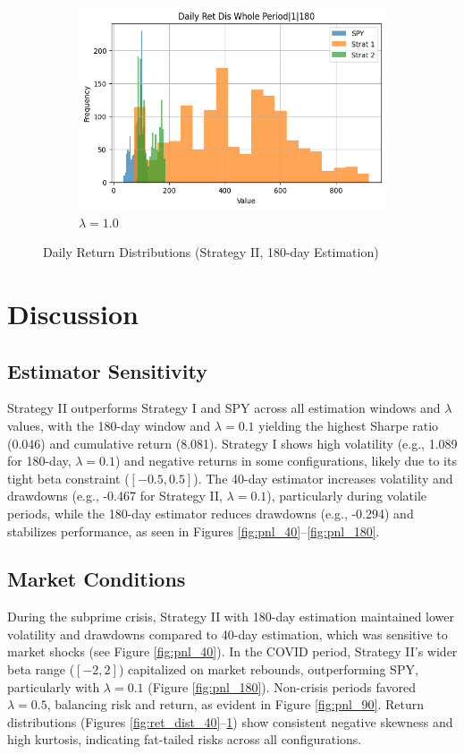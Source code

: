 \documentclass[12pt]{article}
\begin{document}
\begin{figure}[H]
\begin{subfigure}{0.32\textwidth}
\includegraphics[width=\linewidth]{"plots/daily_ret_dis_whole_period_1_180.png"}
\caption{$\lambda=1.0$}
\end{subfigure}
\caption{Daily Return Distributions (Strategy II, 180-day Estimation)}
\label{fig:ret_dist_180}
\end{figure}


\section{Discussion}

\subsection{Estimator Sensitivity}
Strategy II outperforms Strategy I and SPY across all estimation windows and $\lambda$ values, with the 180-day window and $\lambda=0.1$ yielding the highest Sharpe ratio (0.046) and cumulative return (8.081). Strategy I shows high volatility (e.g., 1.089 for 180-day, $\lambda=0.1$) and negative returns in some configurations, likely due to its tight beta constraint ($[-0.5, 0.5]$). The 40-day estimator increases volatility and drawdowns (e.g., -0.467 for Strategy II, $\lambda=0.1$), particularly during volatile periods, while the 180-day estimator reduces drawdowns (e.g., -0.294) and stabilizes performance, as seen in Figures \ref{fig:pnl_40}--\ref{fig:pnl_180}.

\subsection{Market Conditions}
During the subprime crisis, Strategy II with 180-day estimation maintained lower volatility and drawdowns compared to 40-day estimation, which was sensitive to market shocks (see Figure \ref{fig:pnl_40}). In the COVID period, Strategy II's wider beta range ($[-2, 2]$) capitalized on market rebounds, outperforming SPY, particularly with $\lambda=0.1$ (Figure \ref{fig:pnl_180}). Non-crisis periods favored $\lambda=0.5$, balancing risk and return, as evident in Figure \ref{fig:pnl_90}. Return distributions (Figures \ref{fig:ret_dist_40}--\ref{fig:ret_dist_180}) show consistent negative skewness and high kurtosis, indicating fat-tailed risks across all configurations.
\end{document}
